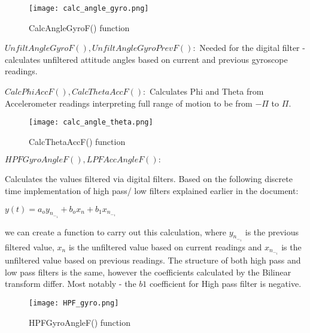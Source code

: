\documentclass{article}
\begin{document}
\begin{flushleft}
\begin{flushleft}
\begin{figure}[H]
    \begin{center}
    \texttt{[image: calc\_angle\_gyro.png]}
    \end{center}
    \caption{CalcAngleGyroF() function}
    \label{fig:my_label}
\end{figure}

\begin{flushleft}
$UnfiltAngleGyroF(), UnfiltAngleGyroPrevF():$\newline
Needed for the digital filter - calculates unfiltered attitude angles based on current and previous gyroscope readings.

$CalcPhiAccF(), CalcThetaAccF():$\newline
Calculates Phi and Theta from Accelerometer readings interpreting full range of motion to be from $-\Pi$ to $\Pi$.

\begin{figure}[H]
    \begin{center}
    \texttt{[image: calc\_angle\_theta.png]}
    \end{center}
    \caption{CalcThetaAccF() function}
    \label{fig:my_label}
\end{figure}

\begin{flushleft}
$HPFGyroAngleF(), LPFAccAngleF():$\newline

Calculates the values filtered via digital filters. Based on the following discrete time implementation of high pass/ low filters explained earlier in the document:
\end{flushleft}
$y(t)=a_o y_n_-_1+b_ox_n+b_1x_n_-_1  $

\begin{flushleft}
we can create a function to carry out this calculation, where $y_n_-_1$ is the previous filtered value, $x_n$ is the unfiltered value based on current readings and $x_n_-_1$ is the unfiltered value based on previous readings. The structure of both high pass and low pass filters is the same, however the coefficients calculated by the Bilinear transform differ. Most notably - the 
$b1$ coefficient for High pass filter is negative.

\begin{figure}[H]
    \begin{center}
    \texttt{[image: HPF\_gyro.png]}
    \end{center}
    \caption{HPFGyroAngleF() function}
    \label{fig:my_label}
\end{figure}


\end{flushleft}
\end{flushleft}
\end{flushleft}
\end{flushleft}
\end{document}
